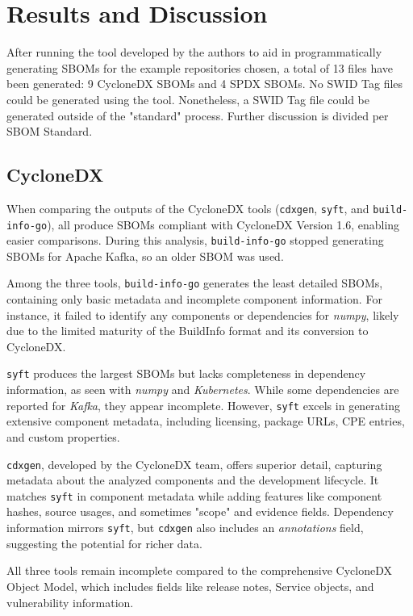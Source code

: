 \section{Results and Discussion} \label{results}

After running the tool developed by the authors to aid in programmatically generating SBOMs for the example repositories chosen, a total of 13 files have been generated: 9 CycloneDX SBOMs and 4 SPDX SBOMs. No SWID Tag files could be generated using the tool. Nonetheless, a SWID Tag file could be generated outside of the "standard" process. Further discussion is divided per SBOM Standard.

\subsection{CycloneDX} \label{results:cdx}

When comparing the outputs of the CycloneDX tools (\verb|cdxgen|, \verb|syft|, and \verb|build-info-go|), all produce SBOMs compliant with CycloneDX Version 1.6, enabling easier comparisons. During this analysis, \verb|build-info-go| stopped generating SBOMs for Apache Kafka, so an older SBOM was used.

Among the three tools, \verb|build-info-go| generates the least detailed SBOMs, containing only basic metadata and incomplete component information. For instance, it failed to identify any components or dependencies for \textit{numpy}, likely due to the limited maturity of the BuildInfo format and its conversion to CycloneDX.

\verb|syft| produces the largest SBOMs but lacks completeness in dependency information, as seen with \textit{numpy} and \textit{Kubernetes}. While some dependencies are reported for \textit{Kafka}, they appear incomplete. However, \verb|syft| excels in generating extensive component metadata, including licensing, package URLs, CPE entries, and custom properties.

\verb|cdxgen|, developed by the CycloneDX team, offers superior detail, capturing metadata about the analyzed components and the development lifecycle. It matches \verb|syft| in component metadata while adding features like component hashes, source usages, and sometimes "scope" and evidence fields. Dependency information mirrors \verb|syft|, but \verb|cdxgen| also includes an \textit{annotations} field, suggesting the potential for richer data.

All three tools remain incomplete compared to the comprehensive CycloneDX Object Model, which includes fields like release notes, Service objects, and vulnerability information.

